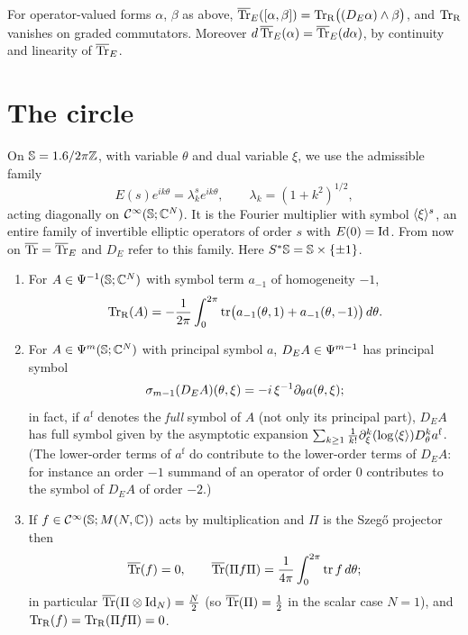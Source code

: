 \begin{corollary}\label{eta:cor:graded-defect}
For operator-valued forms $\alpha$, $\beta$ as above,
$\overline{\operatorname{Tr}}_E([\alpha,\beta])=\operatorname{Tr}_{\mathrm{R}}\bigl((D_E\alpha)\wedge\beta\bigr)$, and $\operatorname{Tr}_{\mathrm{R}}$ vanishes on
graded commutators. Moreover $d\,\overline{\operatorname{Tr}}_E(\alpha)=\overline{\operatorname{Tr}}_E(d\alpha)$, by continuity
and linearity of $\overline{\operatorname{Tr}}_E$.
\end{corollary}

\section{The circle}\label{eta:sec:circle}

On $\mathbb{S}=1.6/2\pi\mathbb{Z}$, with variable $\theta$ and dual variable $\xi$, we use the
admissible family
\begin{equation}\label{eta:eq:circle-E}
E(s)e^{ik\theta}=\lambda_k^se^{ik\theta},\qquad\lambda_k=(1+k^2)^{1/2},
\end{equation}
acting diagonally on $\mathcal{C}^\infty(\mathbb{S};\mathbb{C}^N)$. It is the Fourier multiplier with symbol
$\langle \xi\rangle^s$, an entire family of invertible elliptic operators of order $s$ with
$E(0)=\operatorname{Id}$. From now on $\overline{\operatorname{Tr}}=\overline{\operatorname{Tr}}_E$ and $D_E$ refer to this family. Here
$S^*\mathbb{S}=\mathbb{S}\times\{\pm1\}$.

\begin{lemma}\label{eta:lem:circle}
\begin{enumerate}[label=(\roman*)]
\item For $A\in\Psi^{-1}(\mathbb{S};\mathbb{C}^N)$ with symbol term $a_{-1}$ of homogeneity $-1$,
\[
\operatorname{Tr}_{\mathrm{R}}(A)=-\frac1{2\pi}\int_0^{2\pi}\operatorname{tr}\bigl(a_{-1}(\theta,1)+a_{-1}(\theta,-1)\bigr)\,d\theta.
\]
\item For $A\in\Psi^{m}(\mathbb{S};\mathbb{C}^N)$ with principal symbol $a$, $D_EA\in\Psi^{m-1}$
has principal symbol
\[
\sigma_{m-1}(D_EA)(\theta,\xi)=-i\,\xi^{-1}\partial_\theta a(\theta,\xi);
\]
in fact, if $a^{\mathrm f}$ denotes the \emph{full} symbol of $A$ (not only its principal
part), $D_EA$ has full symbol given by the asymptotic expansion
$\sum_{k\ge1}\frac1{k!}\partial_\xi^k(\log\langle \xi\rangle)D_\theta^ka^{\mathrm f}$. (The lower-order terms of
$a^{\mathrm f}$ do contribute to the lower-order terms of $D_EA$: for instance an order
$-1$ summand of an operator of order $0$ contributes to the symbol of $D_EA$ of order
$-2$.)
\item If $f\in\mathcal{C}^\infty(\mathbb{S};M(N,\mathbb{C}))$ acts by multiplication and $\Pi$ is the Szeg\H{o}
projector then
\[
\overline{\operatorname{Tr}}(f)=0,\qquad\overline{\operatorname{Tr}}(\Pi f\Pi)=\frac1{4\pi}\int_0^{2\pi}\operatorname{tr} f\,d\theta;
\]
in particular $\overline{\operatorname{Tr}}(\Pi\otimes\operatorname{Id}_N)=\frac N2$ (so $\overline{\operatorname{Tr}}(\Pi)=\frac12$ in the scalar
case $N=1$), and $\operatorname{Tr}_{\mathrm{R}}(f)=\operatorname{Tr}_{\mathrm{R}}(\Pi f\Pi)=0$.
\end{enumerate}
\end{lemma}

